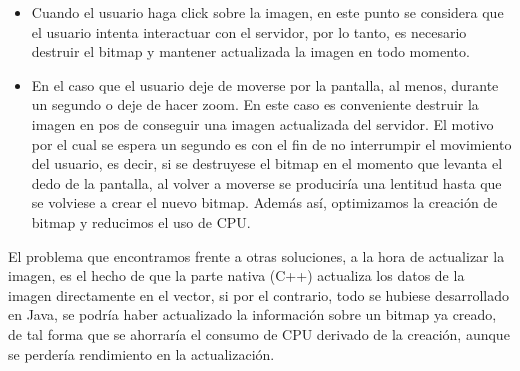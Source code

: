 \begin{itemize}
\begin{itemize}
\item Cuando el usuario haga click sobre la imagen, en este punto se considera que el usuario intenta interactuar con el servidor, por lo tanto, es necesario destruir el bitmap y mantener actualizada la imagen en todo momento.
\item En el caso que el usuario deje de moverse por la pantalla, al menos, durante un segundo o deje de hacer zoom. En este caso es     conveniente destruir la imagen en pos de conseguir una imagen actualizada del servidor. El motivo por el cual se espera un segundo es con el fin de no interrumpir el movimiento del usuario, es decir, si se destruyese el bitmap en el momento que levanta el dedo de la pantalla, al volver a moverse se produciría una lentitud hasta que se volviese a crear el nuevo bitmap. Además así, optimizamos la creación de bitmap y reducimos el uso de CPU.
\end{itemize}

\end{itemize}

El problema que encontramos frente a otras soluciones, a la hora de actualizar la imagen, es el hecho de que la parte nativa (C++) actualiza los datos de la imagen directamente en el vector, si por el contrario, todo se hubiese desarrollado en Java, se podría haber actualizado la información sobre un bitmap ya creado, de tal forma que se ahorraría el consumo de CPU derivado de la creación, aunque se perdería rendimiento en la actualización.\\

